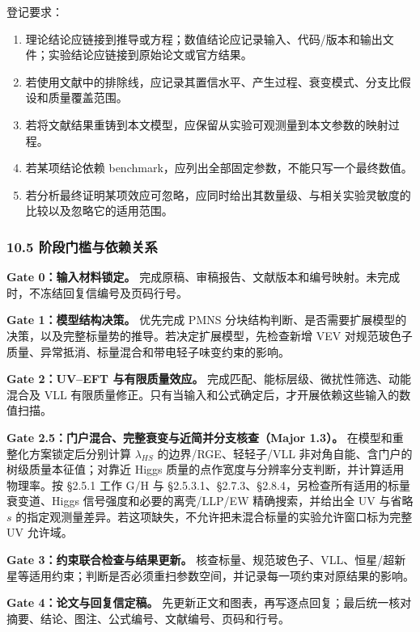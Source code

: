 \documentclass[
]{article}
\providecommand{\tightlist}{%
  \setlength{\itemsep}{0pt}\setlength{\parskip}{0pt}}
\begin{document}
登记要求：

\begin{enumerate}
\def\labelenumi{\arabic{enumi}.}
\tightlist
\item
  理论结论应链接到推导或方程；数值结论应记录输入、代码/版本和输出文件；实验结论应链接到原始论文或官方结果。
\item
  若使用文献中的排除线，应记录其置信水平、产生过程、衰变模式、分支比假设和质量覆盖范围。
\item
  若将文献结果重铸到本文模型，应保留从实验可观测量到本文参数的映射过程。
\item
  若某项结论依赖 benchmark，应列出全部固定参数，不能只写一个最终数值。
\item
  若分析最终证明某项效应可忽略，应同时给出其数量级、与相关实验灵敏度的比较以及忽略它的适用范围。
\end{enumerate}

\subsubsection{10.5
阶段门槛与依赖关系}\label{ux9636ux6bb5ux95e8ux69dbux4e0eux4f9dux8d56ux5173ux7cfb}

\textbf{Gate 0：输入材料锁定。}
完成原稿、审稿报告、文献版本和编号映射。未完成时，不冻结回复信编号及页码行号。

\textbf{Gate 1：模型结构决策。} 优先完成 PMNS
分块结构判断、是否需要扩展模型的决策，以及完整标量势的推导。若决定扩展模型，先检查新增
VEV 对规范玻色子质量、异常抵消、标量混合和带电轻子味变约束的影响。

\textbf{Gate 2：UV--EFT 与有限质量效应。}
完成匹配、能标层级、微扰性筛选、动能混合及 VLL
有限质量修正。只有当输入和公式确定后，才开展依赖这些输入的数值扫描。

\textbf{Gate 2.5：门户混合、完整衰变与近简并分支核查（Major 1.3）。}
在模型和重整化方案锁定后分别计算 \(\lambda_{HS}\) 的边界/RGE、轻轻子/VLL
非对角自能、含门户的树级质量本征值；对靠近 Higgs
质量的点作宽度与分辨率分支判断，并计算适用物理率。按 §2.5.1 工作 G/H 与
§2.5.3.1、§2.7.3、§2.8.4，另检查所有适用的标量衰变道、Higgs
信号强度和必要的离壳/LLP/EW 精确搜索，并给出全 UV 与省略 \(s\)
的指定观测量差异。若这项缺失，不允许把未混合标量的实验允许窗口标为完整
UV 允许域。

\textbf{Gate 3：约束联合检查与结果更新。}
核查标量、规范玻色子、VLL、恒星/超新星等适用约束；判断是否必须重扫参数空间，并记录每一项约束对原结果的影响。

\textbf{Gate 4：论文与回复信定稿。}
先更新正文和图表，再写逐点回复；最后统一核对摘要、结论、图注、公式编号、文献编号、页码和行号。
\end{document}

